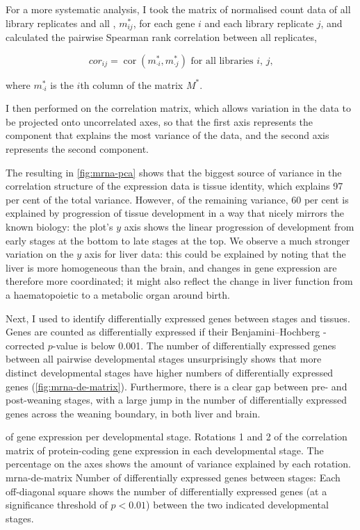 For a more systematic analysis, I took the matrix of normalised count data of
all library replicates and all \mrna[s], \(m_{ij}^*\), for each \mrna gene \(i\)
and each library replicate \(j\), and calculated the pairwise Spearman rank
correlation between all replicates,

\begin{equation}
    cor_{ij} = \operatorname{cor}(m_{\cdot i}^*, m_{\cdot j}^*) \text{\ for all
        libraries \(i\), \(j\),}
\end{equation}

where \(m_{\cdot i}^*\) is the \(i\)th column of the matrix \(M^*\).

I then performed \pca on the correlation matrix, which allows variation in the
data to be projected onto uncorrelated axes, so that the first axis represents
the component that explains the most variance of the data, and the second axis
represents the second component.

The resulting \pca in \cref{fig:mrna-pca} shows that the biggest source of
variance in the correlation structure of the expression data is tissue identity,
which explains \num{97} per cent of the total variance. However, of the
remaining variance, \num{60} per cent is explained by progression of tissue
development in a way that nicely mirrors the known biology: the plot’s \(y\)
axis shows the linear progression of development from early stages at the bottom
to late stages at the top. We observe a much stronger variation on the \(y\)
axis for liver data: this could be explained by noting that the liver is more
homogeneous than the brain, and changes in gene expression are therefore more
coordinated; it might also reflect the change in liver function from a
haematopoietic to a metabolic organ around birth.

Next, I used  \citep{Love:2014} to identify differentially
expressed genes between stages and tissues. Genes are counted as differentially
expressed if their Benjamini–Hochberg \fdr-corrected \(p\)-value is below
\num{0.001}. The number of differentially expressed genes between all pairwise
developmental stages unsurprisingly shows that more distinct developmental
stages have higher numbers of differentially expressed genes
(\cref{fig:mrna-de-matrix}). Furthermore, there is a clear gap between pre- and
post-weaning stages, with a large jump in the number of differentially expressed
genes across the weaning boundary, in both liver and brain.

    {\pca of \mrna gene expression per developmental stage.}
    {Rotations \num{1} and \num{2} of the correlation matrix of
    protein-coding gene expression in each developmental stage. The percentage
    on the axes shows the amount of variance explained by each rotation.}
    {mrna-de-matrix}
    {Number of differentially expressed \mrna genes between stages:}
    {Each off-diagonal square shows the number of differentially
    expressed genes (at a significance threshold of \(p<0.01\)) between
    the two indicated developmental stages.}

